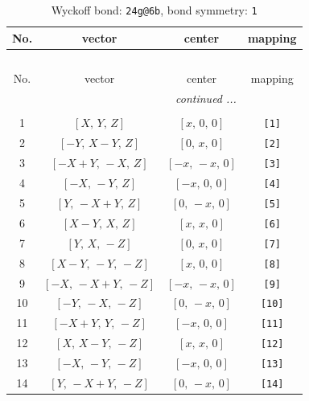 \documentclass[fleqn,8pt]{jsarticle}
\begin{document}
\begin{longtable}{cccc}
\caption{Wyckoff bond: {\tt 24g@6b}, bond symmetry: {\tt 1}}
 \\
 \hline \hline
No. & vector & center & mapping \\ \hline \endfirsthead

\multicolumn{3}{l}{\tablename\ \thetable{}} \\
 \hline \hline
No. & vector & center & mapping \\ \hline \endhead

 \hline \hline
\multicolumn{3}{r}{\footnotesize\it continued ...} \\ \endfoot

 \hline \hline
\multicolumn{3}{r}{} \\ \endlastfoot

1 & $\left[ X,\, Y,\, Z \right]$ & $\left[ x,\, 0,\, 0 \right]$ & {\tt [1]} \\ \hline
2 & $\left[ - Y,\, X - Y,\, Z \right]$ & $\left[ 0,\, x,\, 0 \right]$ & {\tt [2]} \\ \hline
3 & $\left[ - X + Y,\, - X,\, Z \right]$ & $\left[ - x,\, - x,\, 0 \right]$ & {\tt [3]} \\ \hline
4 & $\left[ - X,\, - Y,\, Z \right]$ & $\left[ - x,\, 0,\, 0 \right]$ & {\tt [4]} \\ \hline
5 & $\left[ Y,\, - X + Y,\, Z \right]$ & $\left[ 0,\, - x,\, 0 \right]$ & {\tt [5]} \\ \hline
6 & $\left[ X - Y,\, X,\, Z \right]$ & $\left[ x,\, x,\, 0 \right]$ & {\tt [6]} \\ \hline
7 & $\left[ Y,\, X,\, - Z \right]$ & $\left[ 0,\, x,\, 0 \right]$ & {\tt [7]} \\ \hline
8 & $\left[ X - Y,\, - Y,\, - Z \right]$ & $\left[ x,\, 0,\, 0 \right]$ & {\tt [8]} \\ \hline
9 & $\left[ - X,\, - X + Y,\, - Z \right]$ & $\left[ - x,\, - x,\, 0 \right]$ & {\tt [9]} \\ \hline
10 & $\left[ - Y,\, - X,\, - Z \right]$ & $\left[ 0,\, - x,\, 0 \right]$ & {\tt [10]} \\ \hline
11 & $\left[ - X + Y,\, Y,\, - Z \right]$ & $\left[ - x,\, 0,\, 0 \right]$ & {\tt [11]} \\ \hline
12 & $\left[ X,\, X - Y,\, - Z \right]$ & $\left[ x,\, x,\, 0 \right]$ & {\tt [12]} \\ \hline
13 & $\left[ - X,\, - Y,\, - Z \right]$ & $\left[ - x,\, 0,\, 0 \right]$ & {\tt [13]} \\ \hline
14 & $\left[ Y,\, - X + Y,\, - Z \right]$ & $\left[ 0,\, - x,\, 0 \right]$ & {\tt [14]} \\ \hline

\end{longtable}
\end{document}
